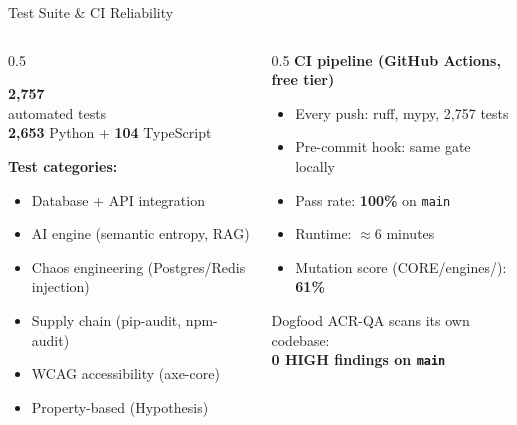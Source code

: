 \documentclass[aspectratio=169,12pt]{beamer}
\newcommand{\bignum}[1]{\textbf{\color{acrBlue}\Large #1}}
\newcommand{\good}[1]{\textbf{\color{acrGreen}#1}}
\begin{document}
\begin{frame}{Test Suite \& CI Reliability}
  \begin{columns}[T]
    \begin{column}{0.5\textwidth}
      \begin{center}
        \bignum{2,757}\\
        \small automated tests\\
        \vspace{4pt}
        \bignum{2,653} Python + \bignum{104} TypeScript
      \end{center}
      \vspace{4pt}
      \textbf{Test categories:}
      \begin{itemize}\small
        \item Database + API integration
        \item AI engine (semantic entropy, RAG)
        \item Chaos engineering (Postgres/Redis injection)
        \item Supply chain (pip-audit, npm-audit)
        \item WCAG accessibility (axe-core)
        \item Property-based (Hypothesis)
      \end{itemize}
    \end{column}
    \begin{column}{0.5\textwidth}
      \textbf{CI pipeline (GitHub Actions, free tier)}
      \begin{itemize}\small
        \item Every push: ruff, mypy, 2,757 tests
        \item Pre-commit hook: same gate locally
        \item Pass rate: \good{100\%} on \texttt{main}
        \item Runtime: $\approx 6$ minutes
        \item Mutation score (CORE/engines/): \textbf{61\%}
      \end{itemize}
      \vspace{4pt}
      \begin{block}{Dogfood}
        ACR-QA scans its own codebase:\\
        \good{0 HIGH findings on \texttt{main}}
      \end{block}
    \end{column}
  \end{columns}
\end{frame}
\end{document}
